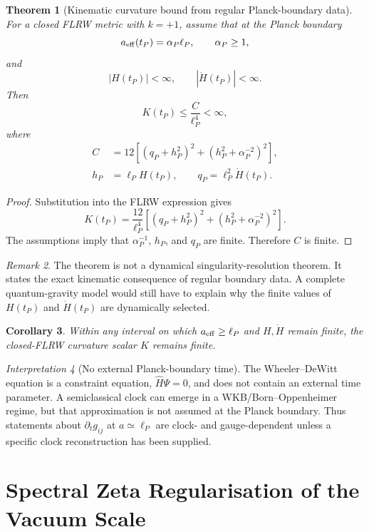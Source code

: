 \documentclass[reprint,aps,prd,letterpaper,superscriptaddress,nofootinbib,longbibliography,floatfix]{revtex4-2}
\newtheorem{theorem}{Theorem}[section]
\newtheorem{corollary}[theorem]{Corollary}
\theoremstyle{remark}
\newtheorem{remark}[theorem]{Remark}
\newtheorem{interpretation}[theorem]{Interpretation}
\begin{document}
\begin{theorem}[Kinematic curvature bound from regular Planck-boundary data]
\label{thm:curvature}
For a closed FLRW metric with \(k=+1\), assume that at the Planck boundary
\[
  a_{\rm eff}(t_P)=\alpha_P\ell_P,\qquad \alpha_P\ge1,
\]
and
\[
  |H(t_P)|<\infty,\qquad |\dot H(t_P)|<\infty .
\]
Then
\[
  K(t_P)\leq \frac{C}{\ell_P^4}<\infty,
\]
where
\[
\begin{aligned}
  C&=12\left[(q_P+h_P^2)^2+\left(h_P^2+\alpha_P^{-2}\right)^2\right],\\
  h_P&=\ell_P H(t_P),\qquad
  q_P=\ell_P^2\dot H(t_P).
\end{aligned}
\]
\end{theorem}

\begin{proof}
Substitution into the FLRW expression gives
\[
  K(t_P)=
  \frac{12}{\ell_P^4}
  \left[(q_P+h_P^2)^2+\left(h_P^2+\alpha_P^{-2}\right)^2\right].
\]
The assumptions imply that \(\alpha_P^{-1}\), \(h_P\), and \(q_P\) are finite.
Therefore \(C\) is finite.
\end{proof}

\begin{remark}
The theorem is not a dynamical singularity-resolution theorem.  It states the
exact kinematic consequence of regular boundary data.  A complete quantum-gravity
model would still have to explain why the finite values of \(H(t_P)\) and
\(\dot H(t_P)\) are dynamically selected.
\end{remark}

\begin{corollary}
Within any interval on which \(a_{\rm eff}\ge\ell_P\) and \(H,\dot H\) remain
finite, the closed-FLRW curvature scalar \(K\) remains finite.
\end{corollary}

\begin{interpretation}[No external Planck-boundary time]
\label{int:no-external-time}
The Wheeler--DeWitt equation is a constraint equation, \(\hat H\Psi=0\), and
does not contain an external time parameter.  A semiclassical clock can emerge in
a WKB/Born--Oppenheimer regime, but that approximation is not assumed at the
Planck boundary.  Thus statements about \(\partial_t g_{ij}\) at
\(a\simeq\ell_P\) are clock- and gauge-dependent unless a specific clock
reconstruction has been supplied.
\end{interpretation}

\section{Spectral Zeta Regularisation of the Vacuum Scale}
\end{document}
